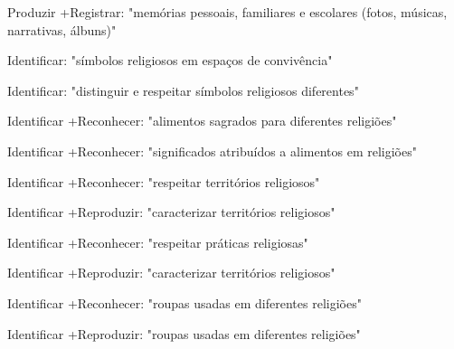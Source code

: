  Produzir +Registrar: "memórias pessoais, familiares e escolares (fotos, músicas, narrativas, álbuns)"

 Identificar: "símbolos religiosos em espaços de convivência"

 Identificar: "distinguir e respeitar símbolos religiosos diferentes"

 Identificar +Reconhecer: "alimentos sagrados para diferentes religiões"

 Identificar +Reconhecer: "significados atribuídos a alimentos em religiões"

 Identificar +Reconhecer: "respeitar territórios religiosos"

 Identificar +Reproduzir: "caracterizar territórios religiosos"

 Identificar +Reconhecer: "respeitar práticas religiosas"

 Identificar +Reproduzir: "caracterizar territórios religiosos"

 Identificar +Reconhecer: "roupas usadas em diferentes religiões"

 Identificar +Reproduzir: "roupas usadas em diferentes religiões"

